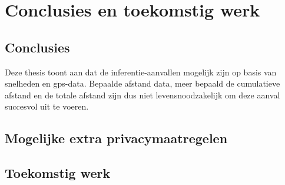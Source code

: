 \chapter{Conclusies en toekomstig werk}
\section{Conclusies}
Deze thesis toont aan dat de inferentie-aanvallen mogelijk zijn op basis van
snelheden en \ac{gps}-data. Bepaalde afstand data, meer bepaald de cumulatieve
afstand en de totale afstand zijn dus niet levensnoodzakelijk om deze aanval
succesvol uit te voeren. 

\section{Mogelijke extra privacymaatregelen}

\section{Toekomstig werk}






